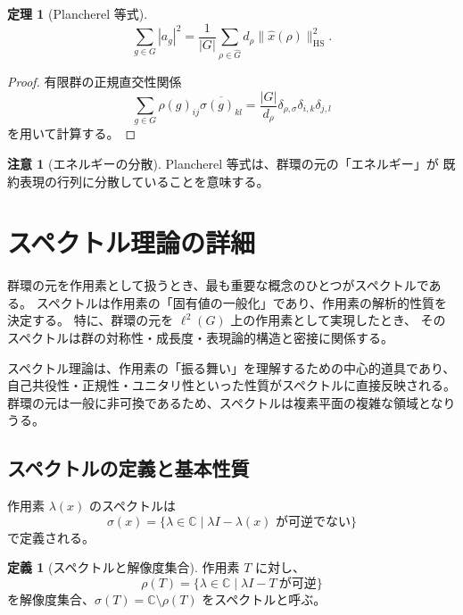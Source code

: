 \documentclass[12pt,a4paper]{ltjarticle}
\newtheorem*{theorem}{定理}
\theoremstyle{definition}
\newtheorem*{definition}{定義}
\newtheorem*{remark}{注意}
\begin{document}
\begin{theorem}[Plancherel 等式]
\[
\sum_{g\in G}|a_g|^2
=\frac{1}{|G|}\sum_{\rho\in\widehat{G}}d_\rho\|\widehat{x}(\rho)\|_{\mathrm{HS}}^2.
\]
\end{theorem}

\begin{proof}
有限群の正規直交性関係
\[
\sum_{g\in G}\rho(g)_{ij}\overline{\sigma(g)_{kl}}
=\frac{|G|}{d_\rho}\delta_{\rho,\sigma}\delta_{i,k}\delta_{j,l}
\]
を用いて計算する。
\end{proof}

\begin{remark}[エネルギーの分散]
Plancherel 等式は、群環の元の「エネルギー」が
既約表現の行列に分散していることを意味する。
\end{remark}

\section{スペクトル理論の詳細}

群環の元を作用素として扱うとき、最も重要な概念のひとつがスペクトルである。
スペクトルは作用素の「固有値の一般化」であり、作用素の解析的性質を決定する。
特に、群環の元を $\ell^2(G)$ 上の作用素として実現したとき、
そのスペクトルは群の対称性・成長度・表現論的構造と密接に関係する。

スペクトル理論は、作用素の「振る舞い」を理解するための中心的道具であり、
自己共役性・正規性・ユニタリ性といった性質がスペクトルに直接反映される。
群環の元は一般に非可換であるため、スペクトルは複素平面の複雑な領域となりうる。

\subsection{スペクトルの定義と基本性質}

作用素 $\lambda(x)$ のスペクトルは
\[
\sigma(x) = \{\lambda \in \mathbb{C} \mid \lambda I - \lambda(x) \text{ が可逆でない}\}
\]
で定義される。

\begin{definition}[スペクトルと解像度集合]
作用素 $T$ に対し、
\[
\rho(T)=\{\lambda\in\mathbb{C}\mid \lambda I-T\ \text{が可逆}\}
\]
を解像度集合、$\sigma(T)=\mathbb{C}\setminus\rho(T)$ をスペクトルと呼ぶ。
\end{definition}
\end{document}

